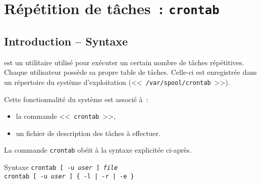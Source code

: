 \section{R{\'e}p{\'e}tition de t{\^a}ches~: {\tt crontab}}

\subsection{Introduction -- Syntaxe}

 est un utilitaire utilis{\'e} pour ex{\'e}cuter un certain nombre de t{\^a}ches
r{\'e}p{\'e}titives. Chaque utilisateur poss{\`e}de sa propre table de t{\^a}ches. Celle-ci est
enregistr{\'e}e dans un r{\'e}pertoire du syst{\`e}me d'exploitation (<<~{\tt /var/spool/crontab}~>>).

Cette fonctionnalit{\'e} du syst{\`e}me est associ{\'e} {\`a}~:
\begin{itemize}
	\item	la commande <<~{\tt crontab}~>>,
	\item	un fichier de description des t{\^a}ches {\`a} effectuer.
\end{itemize}

La commande {\tt crontab} ob{\'e}it {\`a} la syntaxe explicit{\'e}e ci-apr{\`e}s.

\begin{definition}{Syntaxe}
{\tt crontab [ -u {\sl user} ] {\sl file}}\\
{\tt crontab [ -u {\sl user} ] \{ -l | -r | -e \}}
\end{definition}

